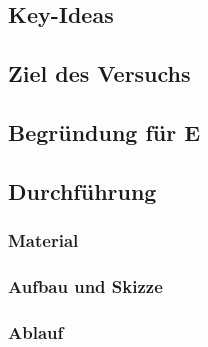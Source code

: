 

\subsection*{Key-Ideas}



\subsection*{Ziel des Versuchs}



\subsection*{Begründung für E}




\subsection*{Durchführung}

\subsubsection*{Material}




\subsubsection*{Aufbau und Skizze}




\subsubsection*{Ablauf}




